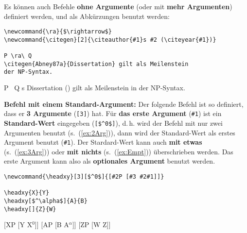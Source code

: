 \begin{frame}[fragile]

Es können auch Befehle \textbf{ohne Argumente} (oder mit \textbf{mehr Argumenten}) definiert werden, und als Abkürzungen benutzt werden:

\newcommand{\citegen}[2]{\citeauthor{#1}s #2 (\citeyear{#1})} 

{\small
\begin{lstlisting}
\newcommand{\ra}{$\rightarrow$}
\newcommand{\citegen}[2]{\citeauthor{#1}s #2 (\citeyear{#1})} 

P \ra\ Q
\citegen{Abney87a}{Dissertation} gilt als Meilenstein 
der NP-Syntax.
\end{lstlisting}
}

\pause 

\ea 
	\ea P \ra\ Q
	\ex \citegen{Abney87a}{Dissertation} gilt als Meilenstein in der NP-Syntax.
	\z 
\z 


\end{frame}


\begin{frame}[fragile]

\textbf{Befehl mit einem Standard-Argument:} Der folgende Befehl ist so definiert, dass er \textbf{3 Argumente} (\lstinline|[3]|) hat. Für \textbf{das erste Argument} (\lstinline|#1|) ist ein \textbf{Standard-Wert} eingegeben (\lstinline|[$^0$]|), d.\,h. wird der Befehl mit nur zwei Argumenten benutzt (s.\ (\ref{ex:2Arg})), dann wird der Standard-Wert als erstes Argument benutzt (\lstinline|#1|). Der Stardard-Wert kann auch \textbf{mit etwas} (s.\ (\ref{ex:3Arg})) oder \textbf{mit nichts} (s.\ (\ref{ex:Empt})) überschrieben werden. Das erste Argument kann also als \textbf{optionales Argument} benutzt werden.

\newcommand{\headxy}[3][$^0$]{[#2P [#3 #2#1]]}

{\small
\begin{lstlisting}
\newcommand{\headxy}[3][$^0$]{[#2P [#3 #2#1]]}

\headxy{X}{Y}
\headxy[$^\alpha$]{A}{B}
\headxy[]{Z}{W}
\end{lstlisting}
}


\ea 
\ea\label{ex:2Arg} \headxy{X}{Y}
\ex\label{ex:3Arg} \headxy[$^\alpha$]{A}{B}
\ex\label{ex:Empt} \headxy[]{Z}{W}
\z 
\z 


\end{frame}

